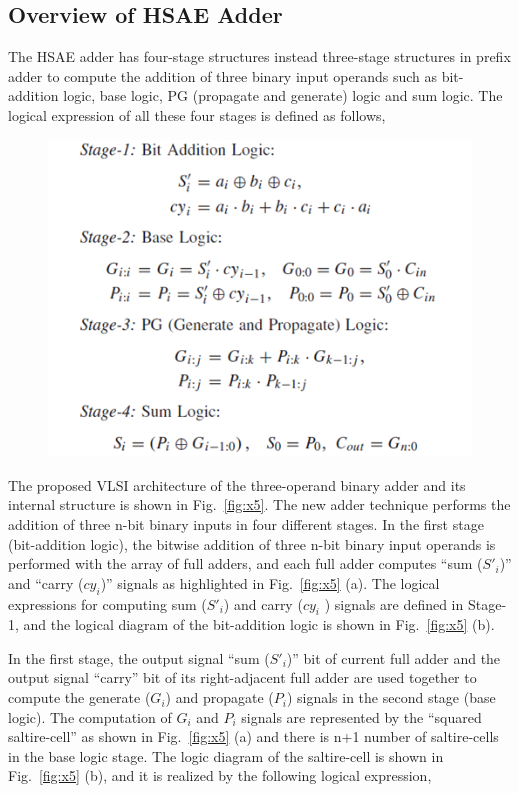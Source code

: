 \subsection{Overview of HSAE Adder}
The HSAE adder has four-stage structures instead three-stage structures in prefix adder to compute the addition of three binary input operands such as bit-addition logic, base logic, PG (propagate and generate) logic and sum logic. The logical expression of all these four stages is defined as follows,
\begin{figure}[htb]
	\centering
	\includegraphics[width=0.80\columnwidth]{Figures/x4}	
	\label{fig:x4}
\end{figure}
The proposed VLSI architecture of the three-operand binary adder and its internal structure is shown in Fig.~\ref{fig:x5}. The new adder technique performs the addition of three n-bit binary inputs in four different stages. In the first stage (bit-addition logic), the bitwise addition of three n-bit binary input operands is performed with the array of full adders, and each full adder computes “sum ($ S'_{i} $)” and “carry ($ cy_{i} $)” signals as highlighted in Fig.~\ref{fig:x5} (a). The logical expressions for computing sum ($ S'_{i} $) and carry ($ cy_{i} $ ) signals are defined in Stage-1, and the logical diagram of the bit-addition logic is shown in Fig.~\ref*{fig:x5} (b). \par 
In the first stage, the output signal “sum ($ S'_{i} $)” bit of current full adder and the output signal “carry” bit of its right-adjacent full adder are used together to compute the generate ($ G_{i} $) and propagate ($ P_{i} $) signals in the second stage (base logic). The computation of $ G_{i} $ and $ P_{i} $ signals are represented by the “squared saltire-cell” as shown in Fig.~\ref{fig:x5} (a) and there is n+1 number of saltire-cells in the base logic stage. The logic diagram of the saltire-cell is shown in Fig.~\ref{fig:x5} (b), and it is realized by the following logical expression,
